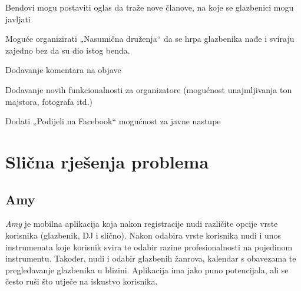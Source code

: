 		\begin{packed_item}
			\item Bendovi mogu postaviti oglas da traže nove članove, na koje se glazbenici mogu javljati
			\item Moguće organizirati „Nasumična druženja“ da se hrpa glazbenika nađe i sviraju zajedno bez da su dio istog benda.
			\item Dodavanje komentara na objave
			\item Dodavanje novih funkcionalnosti za organizatore (mogućnost unajmljivanja ton majstora, fotografa itd.)
			\item Dodati „Podijeli na Facebook“ mogućnost za javne nastupe
		\end{packed_item}
		
		
		
		\section{Slična rješenja problema}
		
		\subsection{Amy}
		
		\textit{Amy} je mobilna aplikacija koja nakon registracije nudi različite opcije vrste korisnika (glazbenik, DJ i slično). Nakon odabira vrste korisnika nudi i unos instrumenata koje korisnik svira te odabir razine profesionalnosti na pojedinom instrumentu. Također, nudi i odabir glazbenih žanrova, kalendar s obavezama te pregledavanje glazbenika u blizini. Aplikacija ima jako puno potencijala, ali se često ruši što utječe na iskustvo korisnika. 
		\\
		
